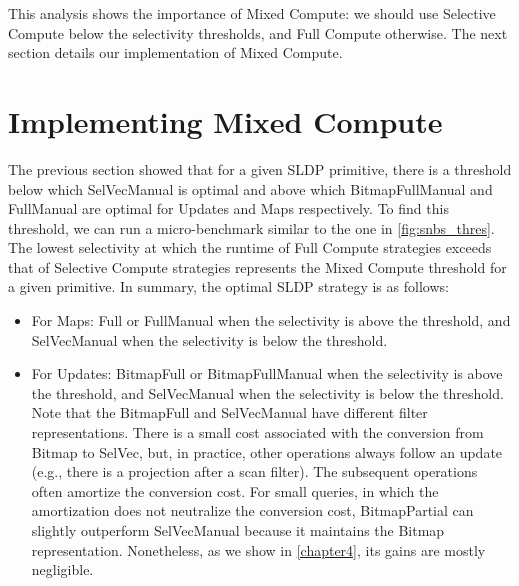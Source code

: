 \documentclass[12pt]{cmuthesis}
\begin{document}
This analysis shows the importance of Mixed Compute: we should use Selective Compute below the selectivity thresholds, and Full Compute otherwise. The next section details our implementation of Mixed Compute.

\section{Implementing Mixed Compute}
\label{mixedcompute}
The previous section showed that for a given SLDP primitive, there is a threshold below which SelVecManual is optimal and above which BitmapFullManual and FullManual are optimal for Updates and Maps respectively. To find this threshold, we can run a micro-benchmark similar to the one in \cref{fig:snbs_thres}. The lowest selectivity at which the runtime of Full Compute strategies exceeds that of Selective Compute strategies represents the Mixed Compute threshold for a given primitive. In summary, the optimal SLDP strategy is as follows:
\begin{itemize}
\item For Maps: Full or FullManual when the selectivity is above the threshold, and SelVecManual when the selectivity is below the threshold.
\item For Updates: BitmapFull or BitmapFullManual when the selectivity is above the threshold, and SelVecManual when the selectivity is below the threshold. Note that the BitmapFull and SelVecManual have different filter representations.  There is a small cost associated with the conversion from Bitmap to SelVec, but, in practice, other operations always follow an update (e.g., there is a projection after a scan filter). The subsequent operations often amortize the conversion cost. For small queries, in which the amortization does not neutralize the conversion cost, BitmapPartial can slightly outperform SelVecManual because it maintains the Bitmap representation. Nonetheless, as we show in \cref{chapter4}, its gains are mostly negligible.
\end{itemize}
\end{document}
